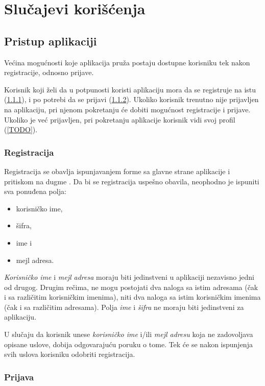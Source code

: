 \chapter{Slučajevi korišćenja}
\label{ch:slucajevi-koriscenja}

\section{Pristup aplikaciji}
\label{sec:pristup-aplikaciji}
Većina mogućnosti koje aplikacija pruža postaju dostupne korisniku tek nakon registracije, odnosno prijave.

Korisnik koji želi da u potpunosti koristi aplikaciju mora da se registruje na istu (\ref{subsec:registracija}), i po potrebi da se prijavi (\ref{subsec:prijava}).
Ukoliko korisnik trenutno nije prijavljen na aplikaciju, pri njenom pokretanju će dobiti mogućnost registracije i prijave.
Ukoliko je već prijavljen, pri pokretanju aplikacije korisnik vidi svoj profil (\ref{TODO}).

\subsection{Registracija}
\label{subsec:registracija}
Registracija se obavlja ispunjavanjem forme sa glavne strane aplikacije i pritiskom na dugme .
Da bi se registracija uspešno obavila, neophodno je ispuniti sva ponuđena polja:
\begin{itemize}
  \item korisničko ime, \item šifra, \item ime i \item mejl adresa.
\end{itemize}

\emph{Korisničko ime} i \emph{mejl adresa} moraju biti jedinstveni u aplikaciji nezavisno jedni od drugog.
Drugim rečima, ne mogu postojati dva naloga sa istim adresama (čak i sa različitim korisničkim imenima), niti dva naloga sa istim korisničkim imenima (čak i sa različitim adresama).
Polja \emph{ime} i \emph{šifra} ne moraju biti jedinstveni za aplikaciju.

U slučaju da korisnik unese \emph{korisničko ime} i/ili \emph{mejl adresu} koja ne zadovoljava opisane uslove, dobija odgovarajuću poruku o tome.
Tek će se nakon ispunjenja svih uslova korisniku odobriti registracija.

\subsection{Prijava}
\label{subsec:prijava}
